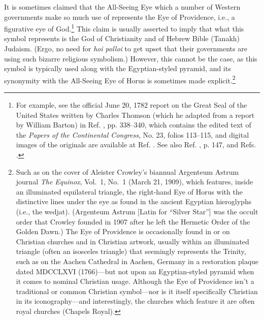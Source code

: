 \documentclass[letterpaper,12pt]{article}
\begin{document}
It is sometimes claimed that the All-Seeing Eye which a number of Western governments make so much use of represents the Eye of Providence, i.e., a figurative eye of God.\footnote{For example, see the official June 20, 1782 report on the Great Seal of the United States written by Charles Thomson (which he adapted from a report by William Barton) in Ref. , pp. 338--340, which contains the edited text of the \emph{Papers of the Continental Congress}, No. 23, folios 113--115, and digital images of the originals are available at Ref. . See also Ref. , p. 147, and Refs. .} This claim is usually asserted to imply that what this symbol represents is the God of Christianity and of Hebrew Bible (Tanakh) Judaism. (Ergo, no need for \emph{hoi polloi} to get upset that their governments are using such bizarre religious symbolism.) However, this cannot be the case, as this symbol is typically used along with the Egyptian-styled pyramid, and its synonymity with the All-Seeing Eye of Horus is sometimes made explicit.\footnote{Such as on the cover of Aleister Crowley's biannual Argenteum Astrum journal \emph{The Equinox}, Vol.~1, No.~1 (March 21, 1909), which features, inside an illuminated equilateral triangle, the right-hand Eye of Horus with the distinctive lines under the eye as found in the ancient Egyptian hieroglyphs (i.e., the wedjat). (Argenteum Astrum [Latin for ``Silver Star''] was the occult order that Crowley founded in 1907 after he left the Hermetic Order of the Golden Dawn.) The Eye of Providence is occasionally found in or on Christian churches and in Christian artwork, usually within an illuminated triangle (often an isosceles triangle) that seemingly represents the Trinity, such as on the Aachen Cathedral in Aachen, Germany in a restoration plaque dated MDCCLXVI (1766)---but not upon an Egyptian-styled pyramid when it comes to nominal Christian usage. Although the Eye of Providence isn't a traditional or common Christian symbol---nor is it itself specifically Christian in its iconography---and interestingly, the churches which feature it are often royal churches (Chapels Royal).\par
}
\end{document}
